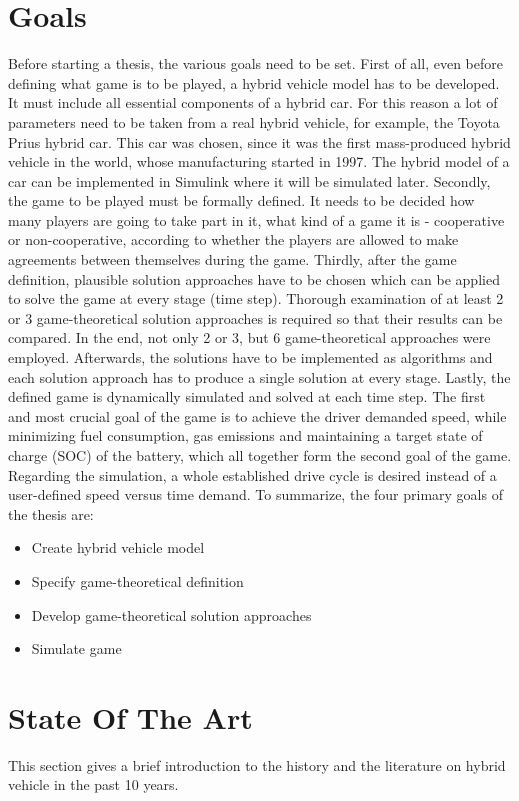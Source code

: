 \section{Goals}
Before starting a thesis, the various goals need to be set. First of all, even before defining what game is to be played, a hybrid vehicle model has to be developed. It must include all essential components of a hybrid car. For this reason a lot of parameters need to be taken from a real hybrid vehicle, for example, the Toyota Prius hybrid car. This car was chosen, since it was the first mass-produced hybrid vehicle in the world, whose manufacturing started in 1997. The hybrid model of a car can be implemented in Simulink where it will be simulated later. Secondly, the game to be played must be formally defined. It needs to be decided how many players are going to take part in it, what kind of a game it is - cooperative or non-cooperative, according to whether the players are allowed to make agreements between themselves during the game. Thirdly, after the game definition, plausible solution approaches have to be chosen which can be applied to solve the game at every stage (time step). Thorough examination of at least 2 or 3 game-theoretical solution approaches is required so that their results can be compared. In the end, not only 2 or 3, but 6 game-theoretical approaches were employed. Afterwards, the solutions have to be implemented as algorithms and each solution approach has to produce a single solution at every stage. Lastly, the defined game is dynamically simulated and solved at each time step. The first and most crucial goal of the game is to achieve the driver demanded speed, while minimizing fuel consumption, gas emissions and maintaining a target state of charge (SOC) of the battery, which all together form the second goal of the game. Regarding the simulation, a whole established drive cycle is desired instead of a user-defined speed versus time demand. To summarize, the four primary goals of the thesis are:

\begin{itemize}
\item Create hybrid vehicle model
\item Specify game-theoretical definition
\item Develop game-theoretical solution approaches
\item Simulate game
\end{itemize}


\section{State Of The Art} 
\label{sec:stateart}
This section gives a brief introduction to the history and the literature on hybrid vehicle in the past 10 years.


